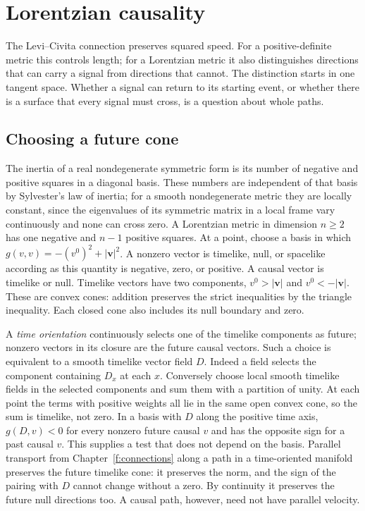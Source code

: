 \chapter{Lorentzian causality}\label{f:causality}

The Levi--Civita connection preserves squared speed. For a positive-definite metric this controls length; for a Lorentzian metric it also distinguishes directions that can carry a signal from directions that cannot. The distinction starts in one tangent space. Whether a signal can return to its starting event, or whether there is a surface that every signal must cross, is a question about whole paths.

\section{Choosing a future cone}

The inertia of a real nondegenerate symmetric form is its number of negative and positive squares in a diagonal basis. These numbers are independent of that basis by Sylvester's law of inertia; for a smooth nondegenerate metric they are locally constant, since the eigenvalues of its symmetric matrix in a local frame vary continuously and none can cross zero. A Lorentzian metric in dimension $n\geq2$ has one negative and $n-1$ positive squares. At a point, choose a basis in which $g(v,v)=-(v^0)^2+|\mathbf v|^2$. A nonzero vector is timelike, null, or spacelike according as this quantity is negative, zero, or positive. A causal vector is timelike or null. Timelike vectors have two components, $v^0>|\mathbf v|$ and $v^0<-|\mathbf v|$. These are convex cones: addition preserves the strict inequalities by the triangle inequality. Each closed cone also includes its null boundary and zero.

A \emph{time orientation} continuously selects one of the timelike components as future; nonzero vectors in its closure are the future causal vectors. Such a choice is equivalent to a smooth timelike vector field $D$. Indeed a field selects the component containing $D_x$ at each $x$. Conversely choose local smooth timelike fields in the selected components and sum them with a partition of unity. At each point the terms with positive weights all lie in the same open convex cone, so the sum is timelike, not zero. In a basis with $D$ along the positive time axis, $g(D,v)<0$ for every nonzero future causal $v$ and has the opposite sign for a past causal $v$. This supplies a test that does not depend on the basis. Parallel transport from Chapter~\ref{f:connections} along a path in a time-oriented manifold preserves the future timelike cone: it preserves the norm, and the sign of the pairing with $D$ cannot change without a zero. By continuity it preserves the future null directions too. A causal path, however, need not have parallel velocity.

